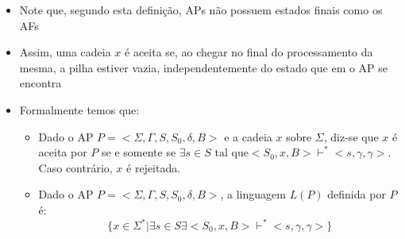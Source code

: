 \documentclass[12pt]{article}
\begin{document}
\begin{itemize}
    $\varnothing$ o AP para.
    \item Note que, segundo esta definição, APs não possuem estados finais como 
    os AFs
    \item Assim, uma cadeia $x$ é aceita se, ao chegar no final do processamento 
    da mesma, a pilha estiver vazia, independentemente do estado que em o AP se 
    encontra
    \item Formalmente temos que:
    \begin{itemize}
        \item Dado o AP $P = <\Sigma, \Gamma, S, S_0, \delta, B>$ e a cadeia 
        $x$ sobre $\Sigma$, diz-se que $x$ é aceita por $P$ se e somente se 
        $\exists s \in S \text{ tal que} <S_0, x, B> \vdash^*<s, \gamma, 
        \gamma>$. Caso contrário, $x$ é rejeitada.
        \item Dado o AP $P = <\Sigma, \Gamma, S, S_0, \delta, B>$, a linguagem 
        $L(P)$ definida por $P$ é:  
        \[
        \{x \in \Sigma^* | \exists s \in S \exists <S_0, x, B> \vdash^* <s, 
        \gamma, \gamma>\}
        \]
    \end{itemize}
\end{itemize}
\end{document}

